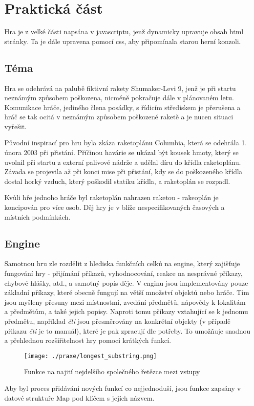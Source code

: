 \documentclass[main.tex]{subfiles}
\begin{document}
\section{Praktická část}
Hra je z velké části napsána v javascriptu, jenž dynamicky upravuje obsah html stránky. Ta je dále upravena pomocí css, aby připomínala starou herní konzoli. 

\subsection{Téma}
Hra se odehrává na palubě fiktivní rakety Shumaker-Levi 9, jenž je při startu neznámým způsobem poškozena, nicméně pokračuje dále v plánovaném letu. Komunikace hráče, jediného člena posádky, s řídicím střediskem je přerušena a hráč se tak ocitá v neznámým způsobem poškozené raketě a je nucen situaci vyřešit. 

Původní inspirací pro hru byla zkáza raketoplánu Columbia, která se odehrála 1. února 2003 při přistání. Příčinou havárie se ukázal být kousek hmoty, který se uvolnil při startu z externí palivové nádrže a udělal díru do křídla raketoplánu. Závada se projevila až při konci mise při přistání, kdy se do poškozeného křídla dostal horký vzduch, který poškodil statiku křídla, a raketoplán se rozpadl. \cite{web:wik:cz:columbia} 

Kvůli hře jednoho hráče byl raketoplán nahrazen raketou - rakeoplán je koncipován pro více osob. Děj hry je v blíže nespecifikovaných časových a místních podmínkách.

\subsection{Engine}
Samotnou hru zle rozdělit z hlediska funkčních celků na engine, který zajišťuje fungování hry - přijímání příkazů, vyhodnocování, reakce na nesprávné příkazy, chybové hlášky, atd., a samotný popis děje.
V enginu jsou implementovány pouze základní příkazy, které obecně fungují na větší množství objektů nebo hráče. Tím jsou myšleny přesuny mezi místnostmi, zvedání předmětů, nápovědy k lokalitám a předmětům, a také jejich popisy. Naproti tomu příkazy vztahující se k jednomu předmětu, například \textit{čti} jsou přesměrovány na konkrétní objekty (v případě přikazu \textit{čti} je to manuál), které je pak zpracují dle potřeby. To umožňuje snadnou a přehlednou rozšiřitelnost hry pomocí krátkých funkcí.

		\begin{figure}[h]
			\centering
			\texttt{[image: ./praxe/longest\_substring.png]}
			\caption{Funkce na najití nejdelšího společného řetězce mezi vstupy }
		\end{figure}
Aby byl proces přidávání nových funkcí co nejjednoduší, jsou funkce zapsány v datové struktuře Map pod klíčem s jejich názvem. 
\end{document}
